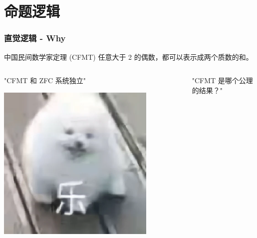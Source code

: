 \documentclass[UTF-8]{ctexbeamer}
\begin{document}
\section{命题逻辑}

\begin{frame}
  \frametitle{直觉逻辑 - Why}
  
  \pause

  \begin{block}{中国民间数学家定理 (CFMT)}
    任意大于 2 的偶数，都可以表示成两个质数的和。
  \end{block}

  \pause

  \vspace{1em}

  \begin{columns}
    \begin{column}{0.5\textwidth}
      \centering
      "CFMT 和 ZFC 系统独立"

      \pause
      \vspace{0.5em}

      \includegraphics[width=0.8\textwidth]{assets/le.png}
    \end{column}
    \pause
    \begin{column}{0.5\textwidth}
      \centering
      "CFMT 是哪个公理的结果？"

      \pause
      \vspace{0.5em}


\end{column}
\end{columns}
\end{frame}
\end{document}
